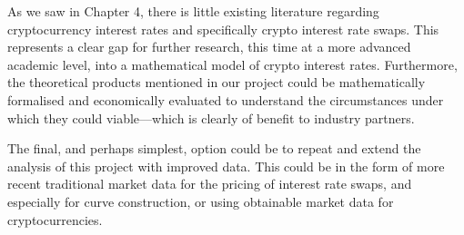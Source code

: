 As we saw in Chapter 4, there is little existing literature regarding cryptocurrency interest rates and specifically crypto interest rate swaps. This represents a clear gap for further research, this time at a more advanced academic level, into a mathematical model of crypto interest rates. Furthermore, the theoretical products mentioned in our project could be mathematically formalised and economically evaluated to understand the circumstances under which they could viable––which is clearly of benefit to industry partners. 

The final, and perhaps simplest, option could be to repeat and extend the analysis of this project with improved data. This could be in the form of more recent traditional market data for the pricing of interest rate swaps, and especially for curve construction, or using obtainable market data for cryptocurrencies. 